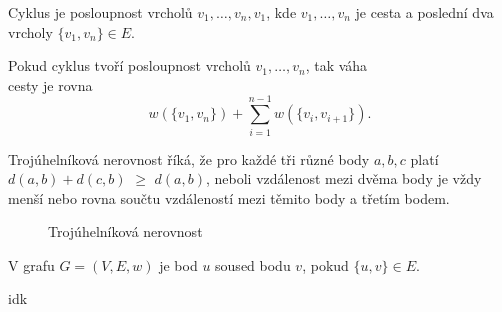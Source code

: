 \begin{definition}[Cyklus]
    \label{definice:cyklus}
    Cyklus je posloupnost vrcholů $v_1,\ldots,v_n,v_1$, kde $v_1,\ldots,v_n$ je cesta a poslední dva vrcholy $\{v_1,v_n\} \in E$.
\end{definition}

\begin{definition}
    \label{definice:vaha_cyklu}
    Pokud cyklus tvoří posloupnost vrcholů $v_1, \ldots, v_n$, tak váha \\cesty je rovna \[ w(\{v_1, v_n\}) + \sum_{i=1}^{n-1}w(\{v_i, v_{i+1}\}). \]
    
\end{definition}

\begin{definition}
    \label{definice:trojuhelnikova_nerovnost}
    Trojúhelníková nerovnost říká, že pro každé tři různé body $a, b, c$ platí \textcolor{myblue}{$d(a, b)+d(c, b)$} $\geq$ \textcolor{myred}{$d(a,b)$}, neboli vzdálenost mezi dvěma body je vždy menší nebo rovna součtu vzdáleností mezi těmito body a třetím bodem. 

    \begin{figure}[h]
        \centering
        \caption{Trojúhelníková nerovnost}
    \end{figure}

    \begin{definition}[Soused]
        \label{definice:soused}
        V grafu $G = (V, E, w)$ je bod $u$ soused bodu $v$, pokud $\{u, v\} \in E$.
    \end{definition}
    
    \begin{definition}
        \label{definice:bigonotation}
        idk
    \end{definition}
\end{definition}